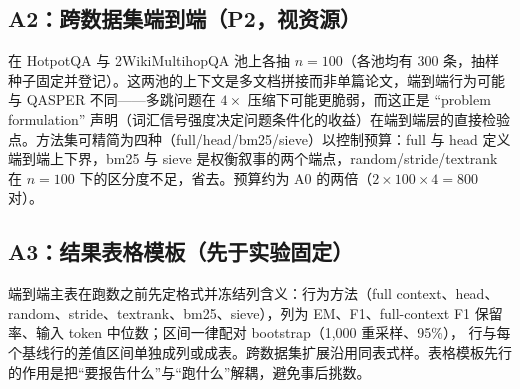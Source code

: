 \subsection{A2：跨数据集端到端（P2，视资源）}

在 HotpotQA 与 2WikiMultihopQA 池上各抽 $n{=}100$（各池均有 300 条，抽样种子固定并登记）。这两池的上下文是多文档拼接而非单篇论文，端到端行为可能与 QASPER 不同——多跳问题在 $4\times$ 压缩下可能更脆弱，而这正是 ``problem formulation'' 声明（词汇信号强度决定问题条件化的收益）在端到端层的直接检验点。方法集可精简为四种（full/head/bm25/sieve）以控制预算：full 与 head 定义端到端上下界，bm25 与 sieve 是权衡叙事的两个端点，random/stride/textrank 在 $n{=}100$ 下的区分度不足，省去。预算约为 A0 的两倍（$2\times100\times4=800$ 对）。

\subsection{A3：结果表格模板（先于实验固定）}

端到端主表在跑数之前先定格式并冻结列含义：行为方法（full context、head、random、stride、textrank、bm25、sieve），列为 EM、F1、full-context F1 保留率、输入 token 中位数；区间一律配对 bootstrap（1{,}000 重采样、95\%），\sieve{} 行与每个基线行的差值区间单独成列或成表。跨数据集扩展沿用同表式样。表格模板先行的作用是把``要报告什么''与``跑什么''解耦，避免事后挑数。
